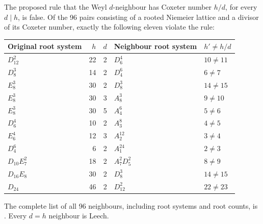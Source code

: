 \begin{statement}
The proposed rule that the Weyl \(d\)-neighbour has Coxeter number
\(h/d\), for every \(d\mid h\), is false. Of the 96 pairs consisting
of a rooted Niemeier lattice and a divisor of its Coxeter number,
exactly the following eleven violate the rule:
\begin{center}\small
\begin{tabular}{lrrll}
\toprule
Original root system&\(h\)&\(d\)&Neighbour root system&\(h'\ne h/d\)\\\midrule
\(D_{12}^2\)&22&2&\(D_6^4\)&\(10\ne11\)\\
\(D_8^3\)&14&2&\(D_4^6\)&\(6\ne7\)\\
\(E_8^3\)&30&2&\(D_8^3\)&\(14\ne15\)\\
\(E_8^3\)&30&3&\(A_8^3\)&\(9\ne10\)\\
\(E_8^3\)&30&5&\(A_4^6\)&\(5\ne6\)\\
\(D_6^4\)&10&2&\(A_3^8\)&\(4\ne5\)\\
\(E_6^4\)&12&3&\(A_2^{12}\)&\(3\ne4\)\\
\(D_4^6\)&6&2&\(A_1^{24}\)&\(2\ne3\)\\
\(D_{10}E_7^2\)&18&2&\(A_7^2D_5^2\)&\(8\ne9\)\\
\(D_{16}E_8\)&30&2&\(D_8^3\)&\(14\ne15\)\\
\(D_{24}\)&46&2&\(D_{12}^2\)&\(22\ne23\)\\\bottomrule
\end{tabular}
\end{center}
The complete list of all 96 neighbours, including root systems and
root counts, is . Every
\(d=h\) neighbour is Leech.
\end{statement}

